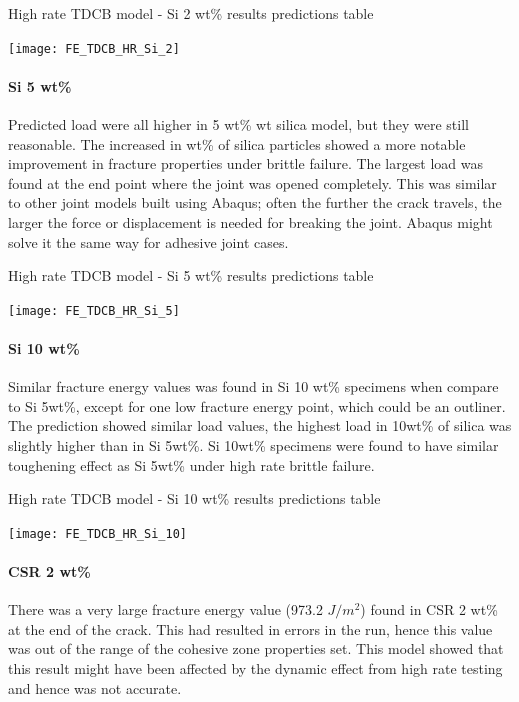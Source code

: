 \documentclass[numbers=noendperiod,chapterprefix=on]{icldt} %
\begin{document}
\begin{table}[!htpb]
    \centering
    \caption{High rate TDCB model - Si 2 wt\% results predictions table}\label{FE_TDCB_HR_Si_2}
    \texttt{[image: FE\_TDCB\_HR\_Si\_2]}
    \end{table}
    \FloatBarrier

\paragraph{Si 5 wt\%}
Predicted load were all higher in 5 wt\% wt silica model, but they were still reasonable. The increased in wt\% of silica particles showed a more notable improvement in fracture properties under brittle failure. The largest load was found at the end point where the joint was opened completely. This was similar to other joint models built using Abaqus; often the further the crack travels, the larger the force or displacement is needed for breaking the joint. Abaqus might solve it the same way for adhesive joint cases.

\begin{table}[!htpb]
    \centering
    \caption{High rate TDCB model - Si 5 wt\% results predictions table}\label{FE_TDCB_HR_Si_5}
    \texttt{[image: FE\_TDCB\_HR\_Si\_5]}
    \end{table}
    \FloatBarrier
    
\paragraph{Si 10 wt\%}
 Similar fracture energy values was found in Si 10 wt\% specimens when compare to Si 5wt\%, except for one low fracture energy point, which could be an outliner. The prediction showed similar load values, the highest load in 10wt\% of silica was slightly higher than in Si 5wt\%. Si 10wt\% specimens were found to have similar toughening effect as Si 5wt\% under high rate brittle failure.
      
    \begin{table}[!htpb]
        \centering
        \caption{High rate TDCB model - Si 10 wt\% results predictions table}\label{FE_TDCB_HR_Si_10}
        \texttt{[image: FE\_TDCB\_HR\_Si\_10]}
        \end{table}
        \FloatBarrier
    
\paragraph{CSR 2 wt\%} 
There was a very large fracture energy value (973.2 $ J/m^{2} $) found in CSR 2 wt\% at the end of the crack. This had resulted in errors in the run, hence this value was out of the range of the cohesive zone properties set. This model showed that this result might have been affected by the dynamic effect from high rate testing and hence was not accurate.        
    
\end{document}
